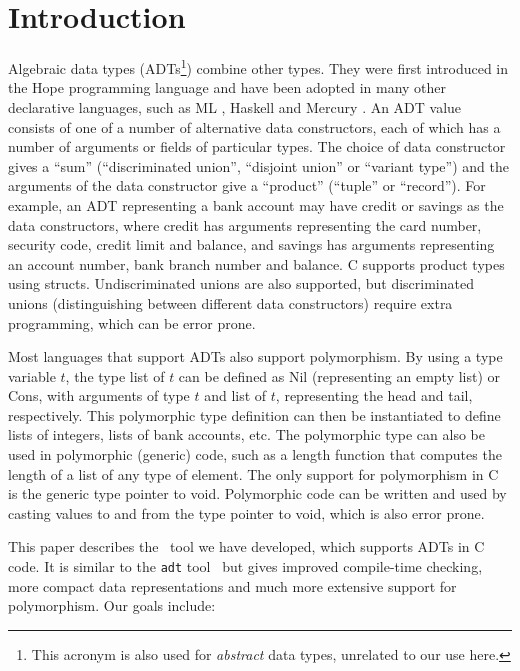 
\section{Introduction}
\label{sec-intro}

Algebraic data types (ADTs\footnote{This acronym is also used for
\emph{abstract} data types, unrelated to our use here.}) combine
other types. They were first introduced in the Hope programming language
\cite{hope} and have been adopted in many other declarative languages,
such as ML \cite{ml}, Haskell \cite{haskell} and Mercury \cite{mercury}.
An ADT value consists of one of a number of alternative data constructors,
each of which has a number of arguments or fields of particular types.
The choice of data constructor gives a ``sum'' (``discriminated union'',
``disjoint union'' or ``variant type'') and the arguments of the data
constructor give a ``product'' (``tuple'' or ``record'').  For example,
an ADT representing a bank account may have credit or savings as
the data constructors, where credit has arguments representing the
card number, security code, credit limit and balance, and savings has
arguments representing an account number, bank branch number and balance.
C supports product types using structs.  Undiscriminated unions are also
supported, but discriminated unions (distinguishing between different
data constructors) require extra programming, which can be error prone.

Most languages that support ADTs also support polymorphism.  By using
a type variable $t$, the type list of $t$ can be defined as Nil
(representing an empty list) or Cons, with arguments of type $t$ and list
of $t$, representing the head and tail, respectively.
This polymorphic type definition can then be instantiated to
define lists of integers, lists of bank accounts, etc.  The polymorphic
type can also be used in polymorphic (generic) code, such as a length
function that computes the length of a list of any type of element.
The only support for polymorphism in C is the generic type pointer
to void.  Polymorphic code can be written and used by casting values to
and from the type pointer to void, which is also error prone.

This paper describes the \adtpp\ tool we have developed, which
supports ADTs in C code.  It is similar to the \texttt{adt} tool~%
\cite{adttool} but gives improved compile-time checking, more compact
data representations and much more extensive support for polymorphism.
Our goals include:

